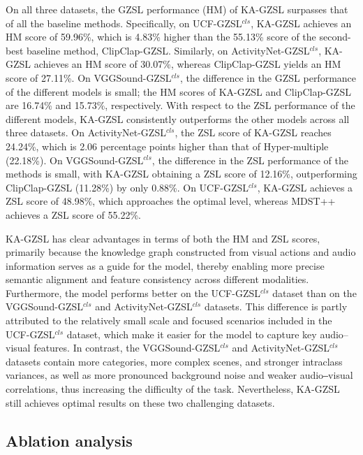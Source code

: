 \documentclass[lettersize,journal]{IEEEtran}
\begin{document}
On all three datasets, the GZSL performance (HM) of KA-GZSL surpasses that of all the baseline methods. Specifically, on UCF-GZSL$^{\textit{cls}}$, KA-GZSL achieves an HM score of 59.96\%, which is 4.83\% higher than the 55.13\% score of the second-best baseline method, ClipClap-GZSL. Similarly, on ActivityNet-GZSL$^{\textit{cls}}$, KA-GZSL achieves an HM score of 30.07\%, whereas ClipClap-GZSL yields an HM score of 27.11\%. On VGGSound-GZSL$^{\textit{cls}}$, the difference in the GZSL performance of the different models is small; the HM scores of KA-GZSL and ClipClap-GZSL are 16.74\% and 15.73\%, respectively. With respect to the ZSL performance of the different models, KA-GZSL consistently outperforms the other models across all three datasets. On ActivityNet-GZSL$^{\textit{cls}}$, the ZSL score of KA-GZSL reaches 24.24\%, which is 2.06 percentage points higher than that of Hyper-multiple (22.18\%). On VGGSound-GZSL$^{\textit{cls}}$, the difference in the ZSL performance of the methods is small, with KA-GZSL obtaining a ZSL score of 12.16\%, outperforming ClipClap-GZSL (11.28\%) by only 0.88\%. On UCF-GZSL$^{\textit{cls}}$, KA-GZSL achieves a ZSL score of 48.98\%, which approaches the optimal level, whereas MDST++ achieves a ZSL score of 55.22\%.


KA-GZSL has clear advantages in terms of both the HM and ZSL scores, primarily because the knowledge graph constructed from visual actions and audio information serves as a guide for the model, thereby enabling more precise semantic alignment and feature consistency across different modalities. Furthermore, the model performs better on the UCF-GZSL$^{\textit{cls}}$ dataset than on the VGGSound-GZSL$^{\textit{cls}}$ and ActivityNet-GZSL$^{\textit{cls}}$ datasets. This difference is partly attributed to the relatively small scale and focused scenarios included in the UCF-GZSL$^{\textit{cls}}$ dataset, which make it easier for the model to capture key audio–visual features. In contrast, the VGGSound-GZSL$^{\textit{cls}}$ and ActivityNet-GZSL$^{\textit{cls}}$ datasets contain more categories, more complex scenes, and stronger intraclass variances, as well as more pronounced background noise and weaker audio‒visual correlations, thus increasing the difficulty of the task. Nevertheless, KA-GZSL still achieves optimal results on these two challenging datasets.


\subsection{Ablation analysis}
\end{document}
